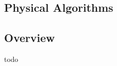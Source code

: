 

\renewcommand{\bibsection}{\subsection{\bibname}}
\begin{bibunit}

\chapter{Physical Algorithms}
\label{ch:physical}

\section{Overview}
todo


\putbib
\end{bibunit}

\newpage\begin{bibunit}\putbib\end{bibunit}
\newpage\begin{bibunit}\putbib\end{bibunit}
\newpage\begin{bibunit}\putbib\end{bibunit}
\newpage\begin{bibunit}\putbib\end{bibunit}
\newpage\begin{bibunit}\putbib\end{bibunit}




